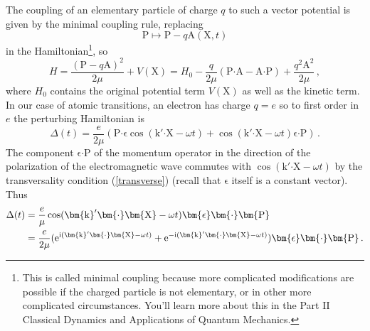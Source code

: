 \documentclass{article}
\theoremstyle{plain}\theoremheaderfont{\normalfont\itshape}\theorembodyfont{\rmfamily}\theoremseparator{.}\newtheorem*{rem}{Remark}\newtheorem*{ex}{Example}\newtheorem*{proof}{Proof}\newtheorem*{altp}{Alternative proof}
\theoremstyle{plain}\theoremheaderfont{\normalfont\bfseries}\theorembodyfont{\rmfamily}\theoremseparator{.}\newtheorem{thm}{Theorem}[section]\newtheorem{lem}[thm]{Lemma}\newtheorem{prop}[thm]{Proposition}\newtheorem*{cor}{Corollary}\newtheorem{defn}[thm]{Definition}\newtheorem{clm}[thm]{Claim}\newtheorem{clminproof}{Claim}
\theoremstyle{break}\theoremheaderfont{\normalfont\itshape}\theorembodyfont{\rmfamily}\theoremseparator{.\medskip}\newtheorem*{proofskip}{Proof}\newtheorem*{exs}{Examples}\newtheorem*{rems}{Remarks}
\theoremstyle{break}\theoremheaderfont{\normalfont\bfseries}\theorembodyfont{\rmfamily}\theoremseparator{.\medskip}\newtheorem{lemskip}[thm]{Lemma}\newtheorem{defnskip}[thm]{Definition}\newtheorem{propskip}[thm]{Proposition}\newtheorem{thmskip}[thm]{Theorem}
\numberwithin{equation}{section}
\newcommand{\ii}{\mathrm{i}}
\newcommand{\ee}{\mathrm{e}}
\newcommand{\vb}[1]{\bm{\mathrm{#1}}}
\newcommand{\vdot}{\bm{\cdot}}
\begin{document}
    The coupling of an elementary particle of charge \(q\) to such a vector potential is given by the minimal coupling rule, replacing
    \begin{equation}
        \vb{P}\longmapsto\vb{P}-q\vb{A}(\vb{X},t)
    \end{equation}
    in the Hamiltonian\footnote{This is called minimal coupling because more complicated modifications are possible if the charged particle is not elementary, or in other more complicated circumstances. You'll learn more about this in the Part II Classical Dynamics and Applications of Quantum Mechanics.}, so
    \begin{equation}
        H=\frac{(\vb{P}-q\vb{A})^2}{2\mu}+V(\vb{X})=H_0-\frac{q}{2\mu}(\vb{P}\vdot\vb{A}-\vb{A}\vdot\vb{P})+\frac{q^2\vb{A}^2}{2\mu}\,,
    \end{equation}
    where \(H_0\) contains the original potential term \(V(\vb{X})\) as well as the kinetic term. In our case of atomic transitions, an electron has charge \(q=e\) so to first order in \(e\) the perturbing Hamiltonian is
    \begin{equation}
        \Delta(t)=\frac{e}{2\mu}\left(\vb{P}\vdot\vb{\epsilon}\cos(\vb{k}'\vdot\vb{X}-\omega t)+\cos(\vb{k}'\vdot\vb{X}-\omega t)\vb{\epsilon}\vdot\vb{P}\right)\,.
    \end{equation}
    The component \(\vb{\epsilon}\vdot\vb{P}\) of the momentum operator in the direction of the polarization of the electromagnetic wave commutes with \(\cos(\vb{k}'\vdot\vb{X}-\omega t)\) by the transversality condition (\ref{transverse}) (recall that \(\vb{\epsilon}\) itself is a constant vector). Thus
    \begin{align}
        \Delta(t)&=\frac{e}{\mu}\cos(\vb{k}'\vdot\vb{X}-\omega t)\vb{\epsilon}\vdot\vb{P}\notag\\
        &=\frac{e}{2\mu}(\ee^{\ii (\vb{k}'\vdot\vb{X}-\omega t)}+\ee^{-\ii (\vb{k}'\vdot\vb{X}-\omega t)})\vb{\epsilon}\vdot\vb{P}\,.\label{photoelectric_perturbation}
    \end{align}
\end{document}
